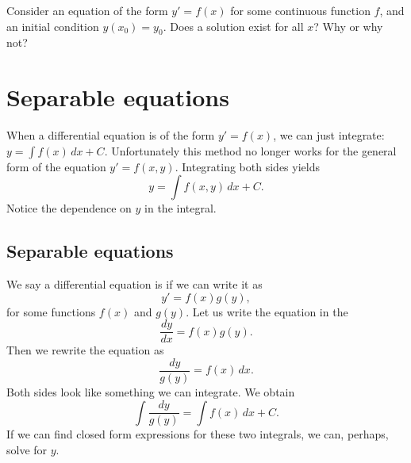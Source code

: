 \begin{exercise}
Consider an equation of the form $y' = f(x)$ for some continuous function
$f$, and an initial condition $y(x_0) = y_0$.  Does a
solution exist for all $x$?  Why or why not?
\end{exercise}


\sectionnewpage
\section{Separable equations}
\label{separable:section}


When a differential equation is of the form
$y' = f(x)$,
we can just integrate:
$y = \int f(x) \,dx + C$. 
Unfortunately this method no longer works for the
general form of the equation
$y' = f(x,y)$.
Integrating both sides yields
\begin{equation*}
y = \int f(x,y) \,dx + C .
\end{equation*}
Notice the dependence on $y$ in the integral.

\subsection{Separable equations}

We say a differential equation is
\emph{}
if we can write it as
\begin{equation*}
y' = f(x)g(y) ,
\end{equation*}
for some functions $f(x)$ and $g(y)$.
Let us write the equation in the 
\begin{equation*}
\frac{dy}{dx} = f(x)g(y) .
\end{equation*}
Then we rewrite the equation as
\begin{equation*}
\frac{dy}{g(y)} = f(x) \,dx .
\end{equation*}
Both sides look like something we can integrate.  We obtain
\begin{equation*}
\int \frac{dy}{g(y)} = \int f(x) \,dx + C .
\end{equation*}
If we can find closed form expressions
for these two integrals, we can, perhaps, solve for $y$.

